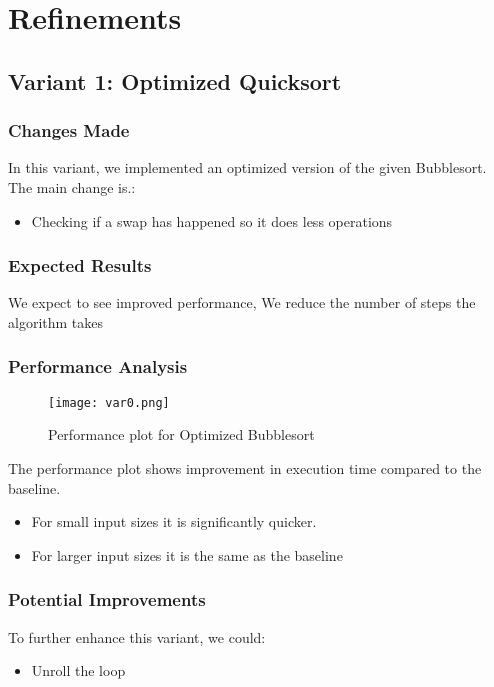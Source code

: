 \documentclass[twocolumn]{article}
\begin{document}
\section{Refinements}

\subsection{Variant 1: Optimized Quicksort}

\subsubsection{Changes Made}
In this variant, we implemented an optimized version of the given Bubblesort. The main change is.:
\begin{itemize}
    \item Checking if a swap has happened so it does less operations
\end{itemize}

\subsubsection{Expected Results}
We expect to see improved performance, We reduce the number of steps  the algorithm takes

\subsubsection{Performance Analysis}
\begin{figure}[H]
    \centering
    \texttt{[image: var0.png]}
    \caption{Performance plot for Optimized Bubblesort}
    \label{fig:variant1_plot}
\end{figure}

The performance plot shows  improvement in execution time compared to the baseline.
\begin{itemize}
    \item For small input sizes it is significantly quicker.
    \item For larger input sizes it is the same as the baseline
\end{itemize}

\subsubsection{Potential Improvements}
To further enhance this variant, we could:
\begin{itemize}
    \item  Unroll the loop

\end{itemize}
\end{document}
